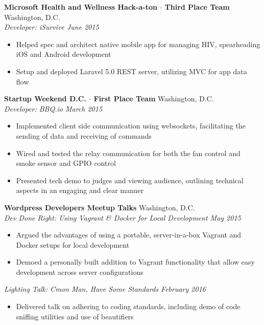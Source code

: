 \documentclass[10pt]{article}
\begin{document}
\textbf{Microsoft Health and Wellness Hack-a-ton $\cdot$ Third Place Team} \hfill Washington, D.C. \\
\textit{Developer: iSurvive \hfill June 2015} \\
\vspace{-1.1em}
\begin{itemize}
  \item Helped spec and architect native mobile app for managing HIV, spearheading iOS and Android development
  \item Setup and deployed Laravel 5.0 REST server, utilizing MVC for app data flow
\end{itemize}
\textbf{Startup Weekend D.C. $\cdot$ First Place Team} \hfill Washington, D.C. \\
\textit{Developer: BBQ.io \hfill March 2015} \\
\vspace{-1.1em}
\begin{itemize}
  \item Implemented client side communication using websockets, facilitating the sending of data and receiving of commands
  \item Wired and tested the relay communication for both the fan control and smoke sensor and GPIO control
  \item Presented tech demo to judges and viewing audience, outlining technical aspects in an engaging and clear manner
\end{itemize}
\textbf{Wordpress Developers Meetup Talks} \hfill Washington, D.C. \\
\textit{Dev Done Right: Using Vagrant \& Docker for Local Development \hfill May 2015} \\
\vspace{-1.1em}
\begin{itemize}
  \item Argued the advantages of using a portable, server-in-a-box Vagrant and Docker setups for local development
  \item Demoed a personally built addition to Vagrant functionality that allow easy development across server configurations
\end{itemize}
\textit{Lighting Talk: C\textquotesingle{}mon Man, Have Some Standards \hfill February 2016} \\
\vspace{-1.1em}
\begin{itemize}
  \item Delivered talk on adhering to coding standards, including demo of code sniffing utilities and use of beautifiers
\end{itemize}
\end{document}
